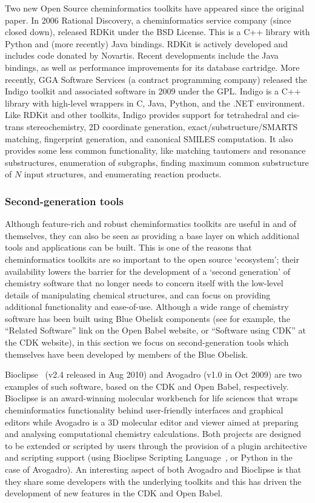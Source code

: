 \documentclass[10pt]{bmc_article}
\newenvironment{bmcformat}{\fussy\setboolean{publ}{true}}{\fussy}
\begin{document}
\begin{bmcformat}
Two new Open Source cheminformatics toolkits have appeared since the
original paper. In 2006 Rational Discovery, a cheminformatics service
company (since closed down), released RDKit \cite{WebRDKit} under the
BSD License. This is a C++ library with Python and (more recently)
Java bindings. RDKit is actively developed and includes
code donated by Novartis. Recent developments include the Java
bindings, as well as performance improvements for its database
cartridge. More recently, GGA Software Services
(a contract programming company)
released the Indigo toolkit \cite{WebIndigo} and associated software
in 2009 under the GPL. Indigo is a C++ library with
high-level wrappers in C, Java, Python, and the .NET
environment. Like RDKit and other toolkits, Indigo provides support for
tetrahedral and cis-trans stereochemistry, 2D coordinate generation,
exact/substructure/SMARTS matching, fingerprint generation, and
canonical SMILES computation.
It also provides some less common functionality, like matching
tautomers and resonance substructures, enumeration of subgraphs,
finding maximum common substructure of $N$ input structures, and
enumerating reaction products.

\subsubsection*{Second-generation tools}

Although feature-rich and robust cheminformatics toolkits are useful
in and of themselves, they can also be seen as providing a base layer
on which additional tools and applications can be built. This is one
of the reasons that cheminformatics toolkits are so important to the
open source `ecosystem'; their availability lowers the barrier for the
development of a `second generation' of chemistry software that no
longer needs to concern itself with the low-level details of
manipulating chemical structures, and can focus on providing
additional functionality and ease-of-use. Although a wide range of
chemistry software has been built using Blue Obelisk
components (see for example, the ``Related Software'' link on the Open
Babel website, or ``Software using CDK'' at the CDK website), in this
section we focus on second-generation tools which themselves have been
developed by members of the Blue Obelisk. 

Bioclipse~\cite{Spjuth:2007fk} (v2.4 released in Aug 2010) and Avogadro
\cite{WebAvogadro} (v1.0 in Oct 2009) are two examples of such software, based
on the CDK and Open Babel, respectively. Bioclipse is an award-winning
molecular workbench for life sciences
that wraps cheminformatics functionality behind user-friendly interfaces and
graphical editors while Avogadro is a 3D molecular editor and viewer aimed at
preparing and analysing computational chemistry calculations. Both
projects are designed to be extended or scripted by users through
the provision of a plugin architective and scripting support (using
Bioclipse Scripting Language~\cite{Bioclipse2}, or Python in the case
of Avogadro).
An interesting
aspect of both Avogadro and Bioclipse is that they share some developers
with the underlying toolkits and this has driven the development of new
features in the CDK and Open Babel.


\end{bmcformat}
\end{document}

